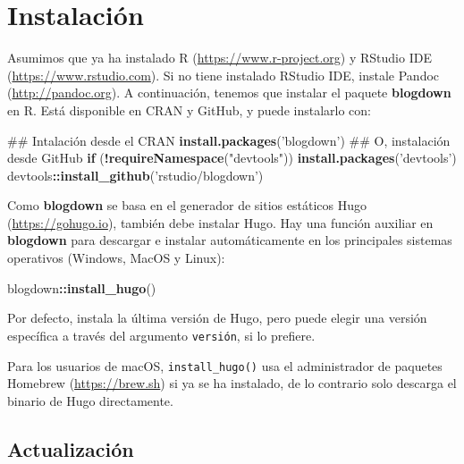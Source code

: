 \documentclass[12pt,]{krantz}
\makeatletter
\newenvironment{Shaded}{\begin{snugshade}}{\end{snugshade}}
\newcommand{\ControlFlowTok}[1]{\textcolor[rgb]{0.13,0.29,0.53}{\textbf{#1}}}
\newcommand{\KeywordTok}[1]{\textcolor[rgb]{0.13,0.29,0.53}{\textbf{#1}}}
\newcommand{\NormalTok}[1]{#1}
\newcommand{\OperatorTok}[1]{\textcolor[rgb]{0.81,0.36,0.00}{\textbf{#1}}}
\newcommand{\StringTok}[1]{\textcolor[rgb]{0.31,0.60,0.02}{#1}}
\newenvironment{kframe}{%
\medskip{}
\setlength{\fboxsep}{.8em}
 \def\at@end@of@kframe{}%
 \ifinner\ifhmode%
  \def\at@end@of@kframe{\end{minipage}}%
  \begin{minipage}{\columnwidth}%
 \fi\fi%
 \def\FrameCommand##1{\hskip\@totalleftmargin \hskip-\fboxsep
 \colorbox{shadecolor}{##1}\hskip-\fboxsep
     \hskip-\linewidth \hskip-\@totalleftmargin \hskip\columnwidth}%
 \MakeFramed {\advance\hsize-\width
   \@totalleftmargin\z@ \linewidth\hsize
   \@setminipage}}%
 {\par\unskip\endMakeFramed%
 \at@end@of@kframe}
\renewenvironment{Shaded}{\begin{kframe}}{\end{kframe}}
\theoremstyle{definition}
\theoremstyle{definition}
\theoremstyle{definition}
\theoremstyle{remark}
\makeatother
\begin{document}
\hypertarget{instalacion}{%
\section{Instalación}\label{instalacion}}

Asumimos que ya ha instalado R (\url{https://www.r-project.org})
\citep{R-base} y RStudio IDE (\url{https://www.rstudio.com}). Si no
tiene instalado RStudio IDE, instale Pandoc
(\url{http://pandoc.org}). A continuación, tenemos que instalar el
paquete \textbf{blogdown} en R. Está disponible en CRAN y GitHub, y
puede instalarlo con:

\begin{Shaded}
\begin{Highlighting}[]
\NormalTok{## Intalación desde el CRAN}
\KeywordTok{install.packages}\NormalTok{(}\StringTok{'blogdown'}\NormalTok{) }
\NormalTok{## O, instalación desde GitHub}
\ControlFlowTok{if}\NormalTok{ (}\OperatorTok{!}\KeywordTok{requireNamespace}\NormalTok{(}\StringTok{"devtools"}\NormalTok{)) }\KeywordTok{install.packages}\NormalTok{(}\StringTok{'devtools'}\NormalTok{)}
\NormalTok{devtools}\OperatorTok{::}\KeywordTok{install_github}\NormalTok{(}\StringTok{'rstudio/blogdown'}\NormalTok{)}
\end{Highlighting}
\end{Shaded}

Como \textbf{blogdown} se basa en el generador de sitios estáticos Hugo
(\url{https://gohugo.io}), también debe instalar Hugo. Hay
una función auxiliar en \textbf{blogdown} para descargar e instalar
automáticamente en los principales sistemas operativos (Windows, MacOS y
Linux):

\begin{Shaded}
\begin{Highlighting}[]
\NormalTok{blogdown}\OperatorTok{::}\KeywordTok{install_hugo}\NormalTok{()}
\end{Highlighting}
\end{Shaded}

Por defecto, instala la última versión de Hugo, pero puede elegir una
versión específica a través del argumento \texttt{versión}, si lo
prefiere.

Para los usuarios de macOS, \texttt{install\_hugo()} usa el
administrador de paquetes Homebrew (\url{https://brew.sh}) si ya se ha
instalado, de lo contrario solo descarga el binario de Hugo
directamente.

\hypertarget{actualizacion}{%
\subsection{Actualización}\label{actualizacion}}
\end{document}
